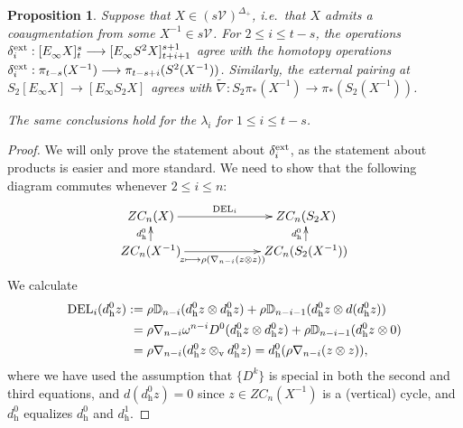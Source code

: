 \documentclass[11pt]{amsart} \renewcommand{\baselinestretch}{1.2}
\theoremstyle{plain}
\newtheorem{prop}[thm]{Proposition}
\numberwithin{equation}{section} %
\theoremstyle{plain}
\newtheorem{prop}[thm]{Proposition}
\numberwithin{equation}{chapter} %
\renewcommand{\to}{\longrightarrow}
\newcommand{\calV}{\mathcal{V}}
\newcommand{\vect}[2]{\calV^{#1}_{#2}}
\newcommand{\twist}{\omega}
\newcommand{\E}[5]{[E^{#1}_{#2}#3]^{#4}_{#5}}
\newcommand{\dver}{_\mathrm{v}}
\newcommand{\dhor}{_\mathrm{h}}
\renewcommand{\mapsto}{\longmapsto}
\begin{document}
\begin{second quadrant homotopy sseq operations}
\begin{prop}
\label{Prop on einfty ops}
Suppose that $X\in (s\vect{}{})^{\Delta_+}$, i.e.\ that $X$ admits a coaugmentation from some $X^{-1}\in s\vect{}{}$. For $2\leq i\leq t-s$, the operations $\delta^\textup{ext}_i:\E{}{\infty}{X}{s}{t}\to \E{}{\infty}{S^2X}{s+1}{t+i+1}$ agree with the homotopy operations $\delta^\textup{ext}_i:\pi_{t-s}(X^{-1})\to \pi_{t-s+i}(S^2(X^{-1}))$. Similarly, the external pairing at $S_2\E{}{\infty}{X}{}{}\to \E{}{\infty}{S_2X}{}{}$ agrees with  $\widetilde{\nabla}:S_2\pi_*(X^{-1})\to \pi_*(S_2(X^{-1}))$.

The same conclusions hold for the $\lambda_i$ for $1\leq i\leq t-s$.
\end{prop}
\begin{proof}
We will only prove the statement about $\delta_i^\textup{ext}$, as the statement about products is easier and more standard. We need to show that the following diagram commutes whenever $2\leq i\leq n$:
\[\xymatrix@R=4mm@C=21mm{
ZC_{n}(X)
\ar[r]^-{\textup{DEL}_i}
\ar[d];[]^-{d\dhor^0}
&%
ZC_{n}(S_2X)\ar[d];[]^-{d\dhor^0}
\\%
ZC_{n}(X^{-1})
\ar[r]_-{z\mapsto \rho(\nabla_{n-i}(z\otimes z))}
&%
ZC_{n}(S_2(X^{-1}))
}\]
We calculate
\begin{alignat*}{3}
\textup{DEL}_i(d\dhor^{0}z)
:={}&
\rho\mathbb{D}_{n-i}(d\dhor^{0}z\otimes d\dhor^{0}z)+\rho\mathbb{D}_{n-i-1}(d\dhor^{0}z\otimes d(d\dhor^{0}z))%
\\
={}&
\rho\nabla_{n-i}\twist^{n-i}D^0(d\dhor^{0}z\otimes d\dhor^{0}z)+\rho\mathbb{D}_{n-i-1}(d\dhor^{0}z\otimes 0)\\
={}&
\rho\nabla_{n-i}(d\dhor^{0}z\otimes\dver d\dhor^{0}z)=d\dhor^{0}(\rho\nabla_{n-i}(z\otimes z)),
\end{alignat*}
where we have used the assumption that $\{D^k\}$ is special in both the second and third equations, and $d(d\dhor^{0}z)=0$ since $z\in ZC_n(X^{-1})$ is a (vertical) cycle, and $d\dhor^{0}$ equalizes $d\dhor^{0}$ and $d\dhor^{1}$.
\end{proof}



\end{second quadrant homotopy sseq operations}
\end{document}
